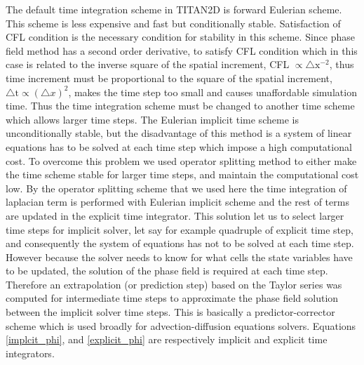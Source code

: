 \documentclass[letterpaper,10pt]{article}
\begin{document}
The default time integration scheme in TITAN2D is forward Eulerian scheme. This scheme is less expensive and fast but conditionally 
stable. Satisfaction of CFL condition is the necessary condition for stability in this scheme. Since phase field 
method has a second order derivative, to satisfy CFL condition which in this case is related to the inverse square of the spatial increment, CFL $\propto \bigtriangleup \text{x}^{-2}$, thus time increment must be proportional to the square 
of the spatial increment, $\bigtriangleup \text{t} \propto ( \bigtriangleup x)^2 $, makes the time step too small and causes unaffordable simulation time.
Thus the time integration scheme must be changed to another time scheme which allows larger time steps.
The Eulerian implicit time scheme is unconditionally stable, but the disadvantage of this method is a system of linear equations has to be solved at each time step which impose a high computational cost.
To overcome this problem we used operator splitting method to either make the time scheme stable for larger time steps, and maintain the computational cost low.  
By the operator splitting scheme that we used here the time integration of laplacian term is performed with Eulerian implicit scheme and the rest of terms are updated in the explicit time integrator. This solution let us to select larger time steps for implicit solver, let say for example quadruple of explicit time step, and consequently the system of equations has not to be solved at each time step. However because the solver needs to know for what cells the state variables have to be updated, the solution of the phase field is required at each time step. Therefore an extrapolation (or prediction step) based on the Taylor series was computed for intermediate time steps to approximate the phase field solution between the implicit solver time steps.
This is basically a predictor-corrector scheme which is used broadly for advection-diffusion equations solvers. Equations \eqref{implcit_phi}, and  \eqref{explicit_phi} are respectively implicit and explicit time integrators.\\
\end{document}

